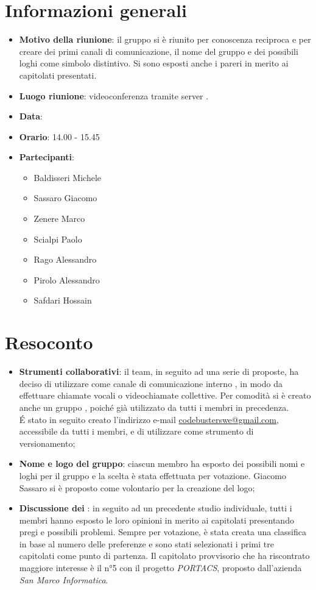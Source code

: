 \section{Informazioni generali}
\begin{itemize}
\item \textbf{Motivo della riunione}: il gruppo si è riunito per conoscenza reciproca e per creare dei primi canali di comunicazione, il nome del gruppo e dei possibili loghi come simbolo distintivo. Si sono esposti anche i pareri in merito ai capitolati presentati.
\item \textbf{Luogo riunione}: videoconferenza tramite server .
\item \textbf{Data}: \Data{}
\item \textbf{Orario}: 14.00 - 15.45
\item \textbf{Partecipanti}:
	\begin{itemize}
	\item Baldisseri Michele
	\item Sassaro Giacomo
	\item Zenere Marco
	\item Scialpi Paolo
	\item Rago Alessandro
	\item Pirolo Alessandro
	\item Safdari Hossain
	\end{itemize}
\end{itemize}
\newpage
\section{Resoconto}
\begin{itemize}
\item \textbf{Strumenti collaborativi}: il team, in seguito ad una serie di proposte, ha deciso di utilizzare come canale di comunicazione interno , in modo da effettuare chiamate vocali o videochiamate collettive. Per comodità si è creato anche un gruppo , poiché già utilizzato da tutti i membri in precedenza.\\ \'E stato in seguito creato l'indirizzo e-mail \href{mailto:codebusterswe@gmail.com}{\color{cyan}codebusterswe@gmail.com}, accessibile da tutti i membri, e di utilizzare  come strumento di versionamento;

\item \textbf{Nome e logo del gruppo}: ciascun membro ha esposto dei possibili nomi e loghi per il gruppo e la scelta è stata effettuata per votazione. Giacomo Sassaro si è proposto come volontario per la creazione del logo;

\item \textbf{Discussione dei }: in seguito ad un precedente studio individuale, tutti i membri hanno esposto le loro opinioni in merito ai capitolati presentando pregi e possibili problemi. Sempre per votazione, è stata creata una classifica in base al numero delle preferenze e sono stati selezionati i primi tre capitolati come punto di partenza. Il capitolato provvisorio che ha riscontrato maggiore interesse è il n°5 con il progetto \textit{PORTACS}, proposto dall'azienda \textit{San Marco Informatica}.
\end{itemize}